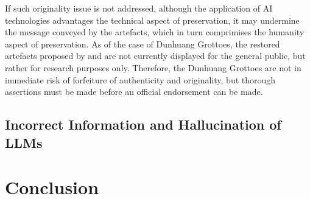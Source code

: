 If such originality issue is not addressed, although the application of AI technologies advantages the technical
aspect of preservation, it may undermine the message conveyed by the artefacts, which in turn comprimises the
humanity aspect of preservation. As of the case of Dunhuang Grottoes, the restored artefacts proposed by
 and  are not currently
displayed for the general public, but rather for research purposes only. Therefore, the Dunhuang Grottoes are
not in immediate risk of forfeiture of authenticity and originality, but thorough assertions must be made
before an official endorsement can be made.

\subsection{Incorrect Information and Hallucination of LLMs}

\section{Conclusion}

\printbibliography